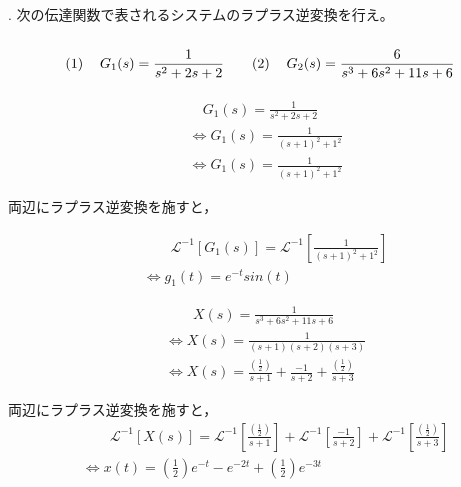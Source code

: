 \documentclass[a4paper,12pt]{article}
\begin{document}
\noindent
{}

\vspace{10mm}


. 次の伝達関数で表されるシステムのラプラス逆変換を行え。
\vspace{-4mm}
\[
\renewcommand{\arraystretch}{3.0} %
\begin{tabular}{@{}rl@{\quad\quad}rl@{}}
(1) & $G_1(s) = \dfrac{1}{s^2+2s+2}$                 & (2) & $G_2(s) = \dfrac{6}{s^3+6s^2+11s+6}$ \\
\end{tabular}
\]

\begin{tcolorbox}[title={1. (1) \(G_1(s) = \dfrac{1}{s^2+2s+2}\) }]
  \vspace{-3mm}
    \begin{align*}
    &\quad G_1(s) =\frac{ 1 }{ s^2 + 2s + 2}  \\
    &\Leftrightarrow G_1(s) =\frac{ 1 }{ ( s + 1 )^2+ 1^2} \\
    &\Leftrightarrow G_1(s) 
    = \frac{ 1}{ ( s + 1 )^2+ 1^2}
\end{align*}

\quad 両辺にラプラス逆変換を施すと，

\vspace{-3mm}
\begin{align*}
    &\qquad \mathcal{L}^{-1} \left[ G_1(s) \right] 
    =\mathcal{L}^{-1} \left[ \frac{ 1 }{ ( s + 1 )^2+ 1^2} \right]\\
    &\Leftrightarrow g_1(t) = e^{-t} sin(t)
\end{align*}
\end{tcolorbox}

\begin{tcolorbox}[title={1. (2) \(G_2(s) = \dfrac{6}{s^3+6s^2+11s+6}\) }]
  \vspace{-3mm}
\begin{align*}
    &\qquad X(s) =\frac{ 1 }{ s^3 +6 s^2+ 11s + 6 }  \\
    &\Leftrightarrow X(s) =\frac{ 1 }{ (s+1)(s+2)(s+3) }  \\
    &\Leftrightarrow X(s) 
    = \frac{(\frac{1}{2})}{s+1}
    + \frac{-1}{s + 2}
    + \frac{(\frac{1}{2})}{s + 3}
\end{align*}

\quad 両辺にラプラス逆変換を施すと，
\vspace{-3mm}
\begin{align*}
    &\qquad \mathcal{L}^{-1} \left[ X(s) \right] 
    =\mathcal{L}^{-1} \left[ \frac{(\frac{1}{2})}{s+1} \right]
    +\mathcal{L}^{-1} \left[ \frac{-1}{s + 2} \right]
    +\mathcal{L}^{-1} \left[ \frac{(\frac{1}{2})}{s + 3} \right] \\
    &\Leftrightarrow x(t) = (\frac{1}{2})e^{-t} - e^{-2t} + (\frac{1}{2})e^{-3t}
\end{align*}
\end{tcolorbox}
\end{document}
